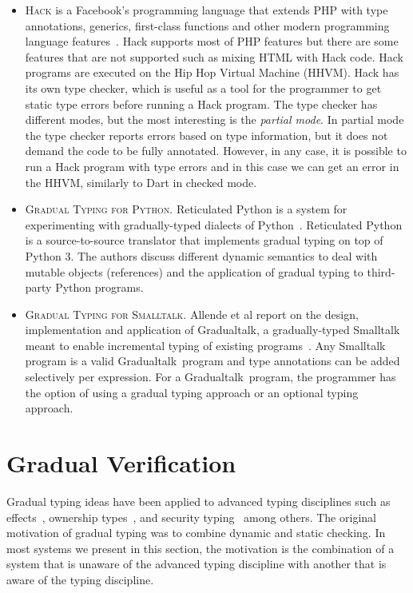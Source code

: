 \documentclass{article}
\newcommand\gradualtalk[0]{Gradualtalk}
\begin{document}
\begin{itemize}
	\item \textsc{Hack} is a Facebook's programming language that extends PHP with type annotations, generics, first-class functions and other modern programming language features~\cite{hack-spec}. Hack supports most of PHP features but there are some features that are not supported such as mixing HTML with Hack code. Hack programs are executed on the Hip Hop Virtual Machine (HHVM). Hack has its own type checker, which is useful as a tool for the programmer to get static type errors before running a Hack program. The type checker has different modes, but the most interesting is the \emph{partial mode}. In partial mode the type checker reports errors based on type information, but it does not demand the code to be fully annotated. However, in any case, it is possible to run a Hack program with type errors and in this case we can get an error in the HHVM, similarly to Dart in checked mode.  
	\item \textsc{Gradual Typing for Python}. Reticulated Python is a system for experimenting with gradually-typed dialects of Python~\cite{vitousekAl:dls2014}. Reticulated  Python is a source-to-source translator that implements gradual typing on top of Python 3. The authors discuss different dynamic semantics to deal with mutable objects (references) and the application of gradual typing to third-party Python programs. 
	\item \textsc{Gradual Typing for Smalltalk.} Allende et al report on the design, implementation and application of \gradualtalk, a gradually-typed Smalltalk meant to enable incremental typing of existing programs~\cite{allendeAl:scp2014}. Any Smalltalk program is a valid \gradualtalk~program and type annotations can be added selectively per expression. For a \gradualtalk~program, the programmer has the option of using a gradual typing approach or an optional typing approach.  
\end{itemize}

\section{Gradual Verification}\label{section:gradual_verification}
Gradual typing ideas have been applied to advanced typing disciplines such as effects~\cite{banadosAl:icfp2014,toroTanter:oopsla2015}, ownership types~\cite{clarkeDrossopoulou:sigplan2002}, and security typing~\cite{disneyFlanagan:stop2011,fennellThiemann:csf2013} among others. The original motivation of gradual typing was to combine dynamic and static checking. In most systems we present in this section, the motivation is the combination of a system that is unaware of the advanced typing discipline with another that is aware of the typing discipline. 
\end{document}
